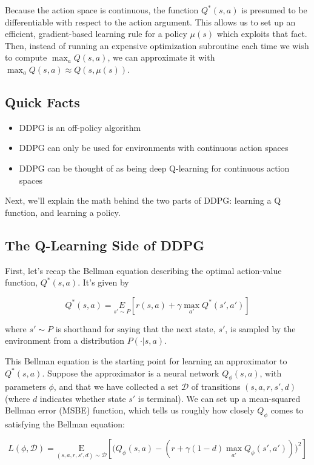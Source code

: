 Because the action space is continuous, the function $Q^*(s,a)$ is presumed to be differentiable with respect to the action argument. This allows us to set up an efficient, gradient-based learning rule for a policy $\mu(s)$ which exploits that fact. Then, instead of running an expensive optimization subroutine each time we wish to compute $\max_a Q(s,a)$, we can approximate it with $\max_a Q(s,a) \approx Q(s,\mu(s))$.

\subsection{Quick Facts}
\begin{itemize}
\item DDPG is an off-policy algorithm
\item DDPG can only be used for environments with continuous action spaces
\item DDPG can be thought of as being deep Q-learning for continuous action spaces
\end{itemize}

Next, we'll explain the math behind the two parts of DDPG: learning a Q function, and learning a policy.

\subsection{The Q-Learning Side of DDPG}

First, let's recap the Bellman equation describing the optimal action-value function, $Q^*(s,a)$. It's given by

\begin{equation}
Q^*(s,a) = \underset{s' \sim P}{E}[r(s, a) + \gamma \max_{a'} Q^*(s', a')]
\end{equation}

where $s' \sim P$ is shorthand for saying that the next state, $s'$, is sampled by the environment from a distribution $P(\cdot| s, a)$.

This Bellman equation is the starting point for learning an approximator to $Q^*(s,a)$. Suppose the approximator is a neural network $Q_{\phi}(s,a)$, with parameters $\phi$, and that we have collected a set ${\mathcal D}$ of transitions $(s,a,r,s',d)$ (where $d$ indicates whether state $s'$ is terminal). We can set up a mean-squared Bellman error (MSBE) function, which tells us roughly how closely $Q_{\phi}$ comes to satisfying the Bellman equation:

\begin{equation}
L(\phi, {\mathcal D}) = \underset{(s,a,r,s',d) \sim {\mathcal D}}{{\mathrm E}}\left[
    \Bigg( Q_{\phi}(s,a) - \left(r + \gamma (1 - d) \max_{a'} Q_{\phi}(s',a') \right) \Bigg)^2
    \right]
\end{equation}

